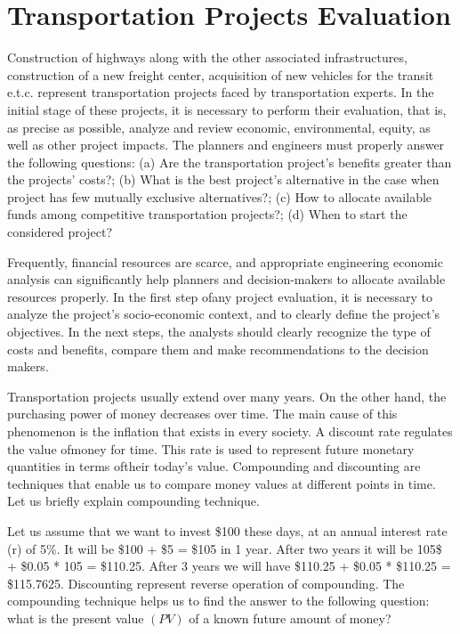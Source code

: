 %
\section{Transportation Projects Evaluation}
Construction of highways along with the other associated infrastructures, construction of a new freight center, acquisition of new vehicles for the transit e.t.c. represent transportation projects faced by transportation experts. In the initial stage of these projects, it is necessary to perform their evaluation, that is, as precise as possible, analyze and review economic, environmental, equity, as well as other project impacts. The planners and engineers must properly answer the following questions: (a) Are the transportation project’s benefits greater than the projects’ costs?; (b) What is the best project’s alternative in the case when project has few mutually exclusive alternatives?; (c) How to allocate available funds among competitive transportation projects?; (d) When to start the considered project?\\
\par
Frequently, financial resources are scarce, and appropriate engineering economic analysis can significantly help planners and decision-makers to allocate available resources properly. In the first step ofany project evaluation, it is necessary to analyze the project’s socio-economic context, and to clearly define the project’s objectives. In the next steps, the analysts should clearly recognize the type of costs and benefits, compare them and make recommendations to the decision makers.\\
\par
Transportation projects usually extend over many years. On the other hand, the purchasing power of money decreases over time. The main cause of this phenomenon is the inflation that exists in every society. A discount rate regulates the value ofmoney for time. This rate is used to represent future monetary quantities in terms oftheir today’s value. Compounding and discounting are techniques that enable us to compare money values at different points in time. Let us briefly explain compounding technique.\\
\par
Let us assume that we want to invest \$100 these days, at an annual interest rate (r) of 5\%. It will be \$100 + \$5 = \$105 in 1 year. After two years it will be 105\$ + \$0.05 * 105 = \$110.25. After 3 years we will have \$110.25 + \$0.05 * \$110.25 = \$115.7625. Discounting represent reverse operation of compounding. The compounding technique helps us to find the answer to the following question: what is the present value $(PV)$ of a known future amount of money?\\
